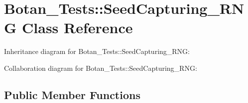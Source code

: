 \hypertarget{class_botan___tests_1_1_seed_capturing___r_n_g}{}\section{Botan\+\_\+\+Tests\+:\+:Seed\+Capturing\+\_\+\+R\+NG Class Reference}
\label{class_botan___tests_1_1_seed_capturing___r_n_g}


Inheritance diagram for Botan\+\_\+\+Tests\+:\+:Seed\+Capturing\+\_\+\+R\+NG\+:


Collaboration diagram for Botan\+\_\+\+Tests\+:\+:Seed\+Capturing\+\_\+\+R\+NG\+:
\subsection*{Public Member Functions}
